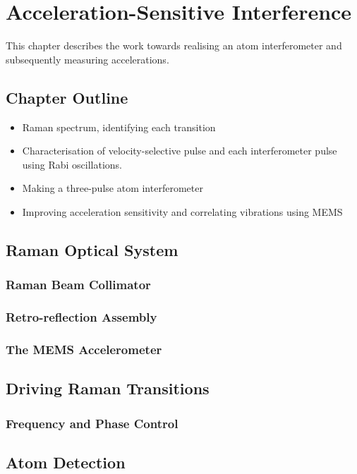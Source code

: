 \chapter{Acceleration-Sensitive Interference}\label{chap:atom_int}
This chapter describes the work towards realising an atom interferometer and subsequently measuring accelerations.
\section{Chapter Outline}
\begin{itemize}
    \item Raman spectrum, identifying each transition
    \item Characterisation of velocity-selective pulse and each interferometer pulse using Rabi oscillations.
    \item Making a three-pulse atom interferometer
    \item Improving acceleration sensitivity and correlating vibrations using MEMS
\end{itemize}
\section{Raman Optical System}\label{sec:setup_ramanoptics}
\subsection{Raman Beam Collimator}\label{subsec:setup_ramancollimator}
\subsection{Retro-reflection Assembly}\label{subsec:setup_ramanmirror}
\subsection{The MEMS Accelerometer}

\section{Driving Raman Transitions}
\subsection{Frequency and Phase Control}

\section{Atom Detection}
